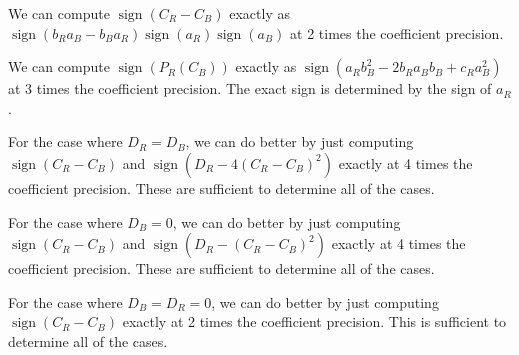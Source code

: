 \documentclass{article}
\DeclareMathOperator{\sign}{sign}
\begin{document}
\noindent
We can compute $\sign(C_R-C_B)$ exactly as $\sign(b_R a_B - b_B
a_R)\sign(a_R)\sign(a_B)$ at 2 times the coefficient precision.

\noindent
We can compute $\sign(P_R(C_B))$ exactly as $\sign(a_R b_B^2 - 2 b_R
a_B b_B + c_R a_B^2)$ at 3 times the coefficient precision.  The exact
sign is determined by the sign of $a_R$.\\
\vspace{3mm}

\noindent
For the case where $D_R=D_B$, we can do better by just computing
$\sign(C_R-C_B)$ and $\sign(D_R-4(C_R-C_B)^2)$ exactly at 4 times the
coefficient precision. These are sufficient to determine all of the
cases.\\
\vspace{3mm}

\noindent
For the case where $D_B=0$, we can do better by just computing
$\sign(C_R-C_B)$ and $\sign(D_R-(C_R-C_B)^2)$ exactly at 4 times the
coefficient precision. These are sufficient to determine all of the
cases.\\
\vspace{3mm}

\noindent
For the case where $D_B=D_R=0$, we can do better by just computing
$\sign(C_R-C_B)$ exactly at 2 times the coefficient precision. This is
sufficient to determine all of the cases.
\end{document}
